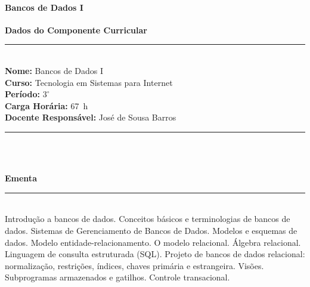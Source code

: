 \paragraph{Bancos de Dados I}

\begin{center}\textbf{Dados do Componente Curricular}\end{center}
\vspace{-5mm}
\noindent\rule{16.5cm}{0.4pt}
\\
\textbf{Nome:} Bancos de Dados I
\\
\textbf{Curso:} Tecnologia em Sistemas para Internet
\\ 
\textbf{Período:} $3^{\circ}$ 
\\
\textbf{Carga Horária:} 67~h 
\\ 
\textbf{Docente Responsável:} José de Sousa Barros 
\\ 
\noindent\rule{16.5cm}{0.4pt}\\
\\
\vspace{-12mm}
\begin{center}\textbf{Ementa}\end{center}
\vspace{-5mm}
\noindent\rule{16.5cm}{0.4pt}
\\ 
Introdução a bancos de dados. Conceitos básicos e terminologias de bancos de dados. Sistemas de Gerenciamento de Bancos de Dados. Modelos e esquemas de dados. Modelo entidade-relacionamento. O modelo relacional. Álgebra relacional. Linguagem de consulta estruturada (SQL). Projeto de bancos de dados relacional: normalização, restrições, índices, chaves primária e estrangeira. Visões. Subprogramas armazenados e gatilhos. Controle transacional. 
 \\

